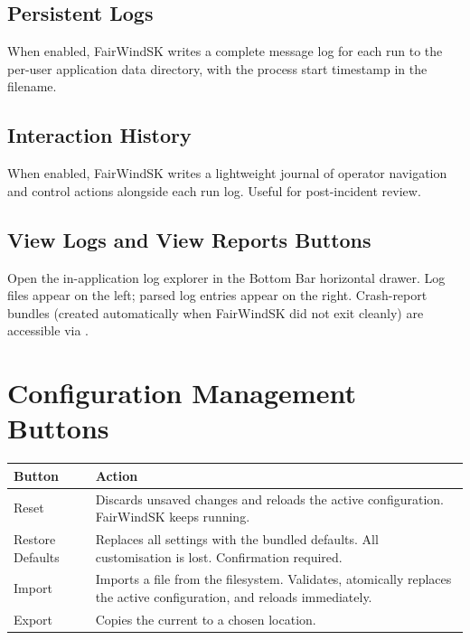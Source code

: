 \subsection{Persistent Logs}

When enabled, FairWindSK writes a complete message log for each run to the per-user
application data directory, with the process start timestamp in the filename.

\subsection{Interaction History}

When enabled, FairWindSK writes a lightweight journal of operator navigation and control
actions alongside each run log.
Useful for post-incident review.

\subsection{View Logs and View Reports Buttons}

Open the in-application log explorer in the Bottom Bar horizontal drawer.
Log files appear on the left; parsed log entries appear on the right.
Crash-report bundles (created automatically when FairWindSK did not exit cleanly) are
accessible via .

\section{Configuration Management Buttons}

\begin{longtable}{L{3.2cm}L{10.5cm}}
\toprule
{}
\color{white}\sffamily\bfseries Button &
\color{white}\sffamily\bfseries Action \\
\midrule
Reset           &
  Discards unsaved changes and reloads the active configuration.
  FairWindSK keeps running. \\
Restore Defaults &
  Replaces all settings with the bundled defaults.
  All customisation is lost. Confirmation required. \\
Import          &
  Imports a  file from the filesystem.
  Validates, atomically replaces the active configuration, and reloads immediately. \\
Export          &
  Copies the current  to a chosen location. \\
\bottomrule
\end{longtable}

